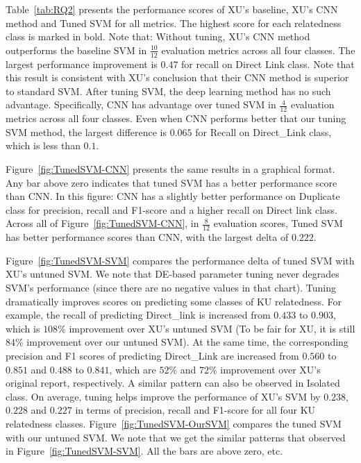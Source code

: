 \documentclass[sigconf]{acmart}
\theoremstyle{break}
\newcommand{\fig}[1]{Figure~\ref{fig:#1}}
\newcommand{\tab}[1]{Table~\ref{tab:#1}}
\begin{document}
\tab{RQ2} presents the performance scores of  XU's baseline, XU's CNN method and Tuned SVM 
for all metrics. The highest score for each relatedness class
  is marked in bold.  Note that: Without tuning, XU's CNN method outperforms
the baseline SVM in $\frac{10}{12}$ evaluation metrics across all four classes. 
The largest performance improvement is $0.47$ for {recall} on {Direct Link} class. Note that this result is consistent with XU's conclusion
that their CNN method is superior to standard SVM.
After tuning SVM, the deep learning method has no such advantage. Specifically, CNN has advantage over tuned SVM in $\frac{4}{12}$ evaluation metrics across all four classes. Even when CNN performs better that our tuning SVM method,
the largest difference is $0.065$ for Recall on Direct\_Link class, which is less than $0.1$. 

\fig{TunedSVM-CNN} presents the same results in a graphical format.
Any bar above zero indicates that tuned SVM has
a better performance score than CNN.
In this figure: CNN has a slightly better performance on
{Duplicate} class for {precision}, {recall} and {F1-score} and
a higher {recall} on {Direct link} class.  Across all of \fig{TunedSVM-CNN},
in $\frac{8}{12}$ evaluation scores, Tuned SVM has better performance scores than CNN, with the largest delta of $0.222$.




 
\fig{TunedSVM-SVM} compares the performance delta of tuned SVM with XU's untuned SVM.
 We note that DE-based parameter tuning never degrades SVM's performance
 (since there are no negative values in that chart). 
 Tuning dramatically improves scores on predicting some classes of KU relatedness. 
 For example, the {recall} of predicting {Direct\_link} is increased 
 from $0.433$ to $0.903$, which is $108\%$ improvement over XU's untuned SVM
 (To be fair for XU, it is still $84\%$ improvement over our untuned SVM).
 At the same time, the corresponding {precision} and {F1} scores of predicting {Direct\_Link} 
 are increased from $0.560$ to $0.851$ and $0.488$ to $0.841$, 
which are $52\%$ and $72\%$ improvement over XU's original report\cite{xu2016predicting}, respectively. 
 A similar pattern can also be observed in {Isolated} class. On average, tuning helps improve the performance
of XU's SVM by $0.238$, $0.228$ and $0.227$ in terms of {precision}, {recall} and {F1-score}
for all four KU relatedness classes. \fig{TunedSVM-OurSVM} compares the tuned SVM with our untuned SVM. We note that we get 
the similar patterns that observed in \fig{TunedSVM-SVM}. All the bars are above zero, etc.
\end{document}
